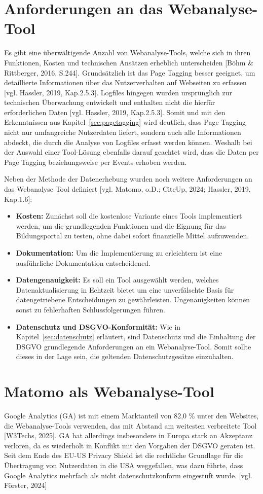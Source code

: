 \section{Anforderungen an das Webanalyse-Tool} %
Es gibt eine überwältigende Anzahl von Webanalyse-Tools, welche sich in ihren Funktionen, Kosten und technischen Ansätzen erheblich unterscheiden [Böhm \& Rittberger, 2016, S.244]. Grundsätzlich ist das Page Tagging besser geeignet, um detaillierte Informationen über das Nutzerverhalten auf Webseiten zu erfassen [vgl. Hassler, 2019, Kap.2.5.3]. Logfiles hingegen wurden ursprünglich zur technischen Überwachung entwickelt und enthalten nicht die hierfür erforderlichen Daten [vgl. Hassler, 2019, Kap.2.5.3]. Somit und mit den Erkenntnissen aus Kapitel~\ref{sec:pagetagging} wird deutlich, dass Page Tagging nicht nur umfangreiche Nutzerdaten liefert, sondern auch alle Informationen abdeckt, die durch die Analyse von Logfiles erfasst werden können. Weshalb bei der Auswahl einer Tool-Lösung ebenfalls darauf geachtet wird, dass die Daten per Page Tagging beziehungsweise per Events erhoben werden. 

Neben der Methode der Datenerhebung wurden noch weitere Anforderungen an das Webanalyse Tool definiert [vgl. Matomo, o.D.; CiteUp, 2024; Hassler, 2019, Kap.1.6]:

\begin{itemize}
    \item \textbf{Kosten:} Zunächst soll die kostenlose Variante eines Tools implementiert werden, um die grundlegenden Funktionen und die Eignung für das Bildungsportal zu testen, ohne dabei sofort finanzielle Mittel aufzuwenden.
    \item \textbf{Dokumentation:} Um die Implementierung zu erleichtern ist eine ausführliche Dokumentation entscheidened.
    \item \textbf{Datengenauigkeit:} Es soll ein Tool ausgewählt werden, welches Datenaktualisierung in Echtzeit bietet um eine unverfälschte Basis für datengetriebene Entscheidungen zu gewährleisten. Ungenauigkeiten können sonst zu fehlerhaften Schlussfolgerungen führen.
    \item \textbf{Datenschutz und DSGVO-Konformität:} Wie in Kapitel~\ref{sec:datenschutz} erläutert, sind Datenschutz und die Einhaltung der DSGVO grundlegende Anforderungen an ein Webanalyse-Tool. Somit sollte dieses in der Lage sein, die geltenden Datenschutzgesätze einzuhalten.
\end{itemize}

\section{Matomo als Webanalyse-Tool}
Google Analytics (GA) ist mit einem Marktanteil von 82,0 \% unter den Websites, die Webanalyse-Tools verwenden, das mit Abstand am weitesten verbreitete Tool [W3Techs, 2025]. GA hat allerdings insbesondere in Europa stark an Akzeptanz verloren, da es wiederholt in Konflikt mit den Vorgaben der DSGVO geraten ist. Seit dem Ende des EU-US Privacy Shield ist die rechtliche Grundlage für die Übertragung von Nutzerdaten in die USA weggefallen, was dazu führte, dass Google Analytics mehrfach als nicht datenschutzkonform eingestuft wurde. [vgl. Förster, 2024]

